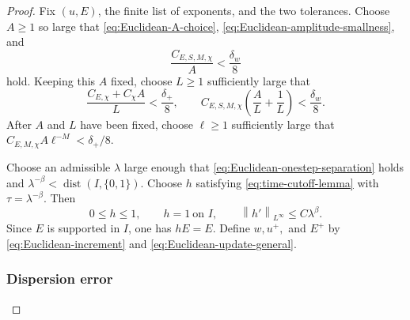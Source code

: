 \documentclass[10pt,a4paper]{amsart}
\newcommand{\la}{\lambda}
\newcommand{\norm}[1]{\left\lVert #1\right\rVert}
\begin{document}
\begin{proof}
Fix $(u,E)$, the finite list of exponents, and the two tolerances.
Choose $A\geq1$ so large that \eqref{eq:Euclidean-A-choice},
\eqref{eq:Euclidean-amplitude-smallness}, and
\begin{equation*}
 \frac{C_{E,S,M,\chi}}{A}<\frac{\delta_w}8
\end{equation*}
  hold.  Keeping this $A$ fixed, choose $L\geq1$ sufficiently large that
\begin{equation*}
 \frac{C_{E,\chi}+C_\chi A}{L}<\frac{\delta_+}{8},
 \qquad
 C_{E,S,M,\chi}\left(\frac{A}{L}+\frac1L\right)<\frac{\delta_w}8.
\end{equation*}
After $A$ and $L$ have been fixed, choose $\ell\geq1$ sufficiently large
that $C_{E,M,\chi}A\ell^{-M}<\delta_+/8$.

Choose an admissible $\la$ large enough that
\eqref{eq:Euclidean-onestep-separation} holds and
$\la^{-\beta}<\operatorname{dist}(I,\{0,1\})$.  Choose $h$ satisfying
\eqref{eq:time-cutoff-lemma} with $\tau=\la^{-\beta}$.  Then
\begin{equation*}
 0\leq h\leq1,\qquad h=1\ \text{on }I,\qquad
 \norm{h'}_{L^\infty}\leq C\la^\beta.
\end{equation*}
Since $E$ is supported in $I$, one has $hE=E$.  Define $w,u^+,$ and $E^+$
by \eqref{eq:Euclidean-increment} and
\eqref{eq:Euclidean-update-general}.

\subsubsection*{Dispersion error}


\end{proof}
\end{document}
